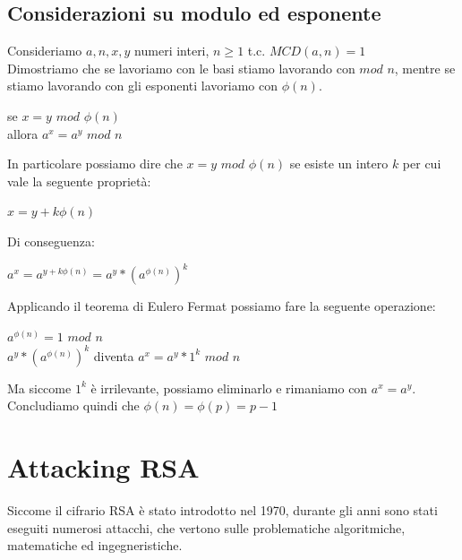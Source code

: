 \documentclass[11pt, oneside]{article}   	%
\begin{document}
\subsection*{Considerazioni su modulo ed esponente}
Consideriamo $a, n, x, y$ numeri interi, $n \geq 1$ t.c. $MCD(a,n) = 1$ \\
Dimostriamo che se lavoriamo con le basi stiamo lavorando con $mod$ $n$, mentre se stiamo lavorando con gli esponenti lavoriamo con $\phi(n)$.
\begin{center}
se $x = y$ $mod$ $\phi(n)$\\allora $a^x = a^y$ $mod$ $n$
\end{center}
In particolare possiamo dire che $x = y$ $mod$ $\phi(n)$ se esiste un intero $k$ per cui vale la seguente proprietà:
\begin{center}
$x = y + k\phi(n)$
\end{center}
Di conseguenza:
\begin{center}
$a^x = a^{y + k \phi(n)} = a^y * (a^{\phi(n)})^k$
\end{center}
Applicando il teorema di Eulero Fermat possiamo fare la seguente operazione: 
\begin{center}
$a^{\phi(n)} = 1$ $mod$ $n$\\
$a^y * (a^{\phi(n)})^k$ diventa $a^x = a^y * 1^k$ $mod$ $n$
\end{center}
Ma siccome $1^k$ è irrilevante, possiamo eliminarlo e rimaniamo con $a^x = a^y$. Concludiamo quindi che $\phi(n) = \phi(p) = p-1$




\section*{Attacking RSA}
Siccome il cifrario RSA è stato introdotto nel 1970, durante gli anni sono stati eseguiti numerosi attacchi, che vertono sulle problematiche algoritmiche, matematiche ed ingegneristiche. 
\end{document}
